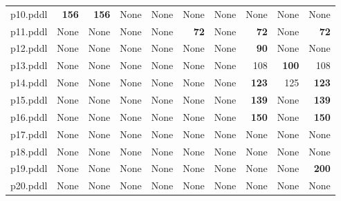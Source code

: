 \documentclass{article}
\begin{document}
\begin{tabular}{@{}lrrrrrrrrr@{}}
p10.pddl & \textbf{156} & \textbf{156} & \multicolumn{1}{|l|}{None} & \multicolumn{1}{|l|}{None} & \multicolumn{1}{|l|}{None} & \multicolumn{1}{|l|}{None} & \multicolumn{1}{|l|}{None} & \multicolumn{1}{|l|}{None} & \multicolumn{1}{|l|}{None} \\
p11.pddl & \multicolumn{1}{|l|}{None} & \multicolumn{1}{|l|}{None} & \multicolumn{1}{|l|}{None} & \multicolumn{1}{|l|}{None} & \textbf{72} & \multicolumn{1}{|l|}{None} & \textbf{72} & \multicolumn{1}{|l|}{None} & \textbf{72} \\
p12.pddl & \multicolumn{1}{|l|}{None} & \multicolumn{1}{|l|}{None} & \multicolumn{1}{|l|}{None} & \multicolumn{1}{|l|}{None} & \multicolumn{1}{|l|}{None} & \multicolumn{1}{|l|}{None} & \textbf{90} & \multicolumn{1}{|l|}{None} & \multicolumn{1}{|l|}{None} \\
p13.pddl & \multicolumn{1}{|l|}{None} & \multicolumn{1}{|l|}{None} & \multicolumn{1}{|l|}{None} & \multicolumn{1}{|l|}{None} & \multicolumn{1}{|l|}{None} & \multicolumn{1}{|l|}{None} & 108 & \textbf{100} & 108 \\
p14.pddl & \multicolumn{1}{|l|}{None} & \multicolumn{1}{|l|}{None} & \multicolumn{1}{|l|}{None} & \multicolumn{1}{|l|}{None} & \multicolumn{1}{|l|}{None} & \multicolumn{1}{|l|}{None} & \textbf{123} & 125 & \textbf{123} \\
p15.pddl & \multicolumn{1}{|l|}{None} & \multicolumn{1}{|l|}{None} & \multicolumn{1}{|l|}{None} & \multicolumn{1}{|l|}{None} & \multicolumn{1}{|l|}{None} & \multicolumn{1}{|l|}{None} & \textbf{139} & \multicolumn{1}{|l|}{None} & \textbf{139} \\
p16.pddl & \multicolumn{1}{|l|}{None} & \multicolumn{1}{|l|}{None} & \multicolumn{1}{|l|}{None} & \multicolumn{1}{|l|}{None} & \multicolumn{1}{|l|}{None} & \multicolumn{1}{|l|}{None} & \textbf{150} & \multicolumn{1}{|l|}{None} & \textbf{150} \\
p17.pddl & \multicolumn{1}{|l|}{None} & \multicolumn{1}{|l|}{None} & \multicolumn{1}{|l|}{None} & \multicolumn{1}{|l|}{None} & \multicolumn{1}{|l|}{None} & \multicolumn{1}{|l|}{None} & \multicolumn{1}{|l|}{None} & \multicolumn{1}{|l|}{None} & \multicolumn{1}{|l|}{None} \\
p18.pddl & \multicolumn{1}{|l|}{None} & \multicolumn{1}{|l|}{None} & \multicolumn{1}{|l|}{None} & \multicolumn{1}{|l|}{None} & \multicolumn{1}{|l|}{None} & \multicolumn{1}{|l|}{None} & \multicolumn{1}{|l|}{None} & \multicolumn{1}{|l|}{None} & \multicolumn{1}{|l|}{None} \\
p19.pddl & \multicolumn{1}{|l|}{None} & \multicolumn{1}{|l|}{None} & \multicolumn{1}{|l|}{None} & \multicolumn{1}{|l|}{None} & \multicolumn{1}{|l|}{None} & \multicolumn{1}{|l|}{None} & \multicolumn{1}{|l|}{None} & \multicolumn{1}{|l|}{None} & \textbf{200} \\
p20.pddl & \multicolumn{1}{|l|}{None} & \multicolumn{1}{|l|}{None} & \multicolumn{1}{|l|}{None} & \multicolumn{1}{|l|}{None} & \multicolumn{1}{|l|}{None} & \multicolumn{1}{|l|}{None} & \multicolumn{1}{|l|}{None} & \multicolumn{1}{|l|}{None} & \multicolumn{1}{|l|}{None} \\
\end{tabular}
\end{document}
